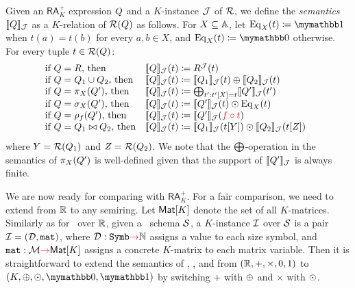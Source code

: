 Given an $\mathsf{RA}_{K}^+$ expression $Q$ and a $K$-instance $\mathcal{J}$ of $\mathcal{R}$, we define the \textit{semantics} $\llbracket Q \rrbracket_{\mathcal{J}}$ as a $K$-relation of $\mathcal{R}(Q)$ as follows. For $X \subseteq \mathbb{A}$, let $\operatorname{Eq}_X(t)\coloneqq  \kone$ when $t(a) = t(b)$ for every $a, b \in X$, and $\operatorname{Eq}_X(t)\coloneqq  \kzero$ otherwise. For every tuple $t \in \mathcal{R}(Q)$:
$$
\begin{array}{ll}
\!\!\!\text{if $\arae = R$, then} & \ssem{\arae}{\cJ}(t)\coloneqq  R^\cJ(t) \\
\!\!\!\text{if $\arae = \arae_1 \cup \arae_2$, then} & \ssem{\arae}{\cJ}(t)\coloneqq  \ssem{\arae_1}{\cJ}(t) \ksum \ssem{\arae_2}{\cJ}(t)  \\
\!\!\!\text{if $\arae = \pi_X(\arae')$, then} & \ssem{\arae}{\cJ}(t)\coloneqq  \bigksum_{t': t'[X] = t} \ssem{\arae'}{\cJ}(t') \\
\!\!\!\text{if $\arae = \sigma_X(\arae')$, then} & \ssem{\arae}{\cJ}(t)\coloneqq  
\ssem{\arae'}{\cJ}(t) \kprod \operatorname{Eq}_X(t)  \\
\!\!\!\text{if $\arae = \rho_f(\arae')$, then} & \ssem{\arae}{\cJ}(t)\coloneqq  
\ssem{\arae'}{\cJ}(\EDIT{f \circ t})  
\\
\!\!\!\text{if $\arae = \arae_1 \bowtie \arae_2$, then} & \ssem{\arae}{\cJ}(t)\coloneqq   \ssem{\arae_1}{\cJ}(t[Y]) \kprod  \ssem{\arae_2}{\cJ}(t[Z])
\end{array}
$$
where $Y = \mathcal{R}(Q_1)$ and $Z = \mathcal{R}(Q_2)$. We note that the $\bigoplus$-operation in the semantics of $\pi_X(Q')$ is well-defined given that the support of $\llbracket Q' \rrbracket_{\mathcal{J}}$ is always finite. 

We are now ready for comparing \langsum with $\mathsf{RA}_{K}^+$. For a fair comparison, we need to extend \langsum from $\mathbb{R}$ to any semiring. Let $\textsf{Mat}[K]$ denote the set of all $K$-matrices. 
Similarly as for \lang\ over $\mathbb{R}$, given a \lang\ schema $\mathcal{S}$, a $K$-instance $\mathcal{I}$ over $\mathcal{S}$ is a pair $\mathcal{I} = (\mathcal{D},\texttt{mat})$, where $\mathcal{D} : \texttt{Symb} {\color{red} \to} \mathbb{N}$ assigns a value to each size symbol, and $\texttt{mat} : \mathcal{M} {\color{red} \to} \textsf{Mat}[K]$ assigns a concrete $K$-matrix to each matrix variable. Then it is straightforward to extend the semantics of \lang, \langfor, and \langsum from $(\mathbb{R}, +, \times, 0, 1)$ to $(K, \ksum, \kprod, \kzero, \kone)$ by switching $+$ with $\oplus$ and $\times$ with $\odot$. 

